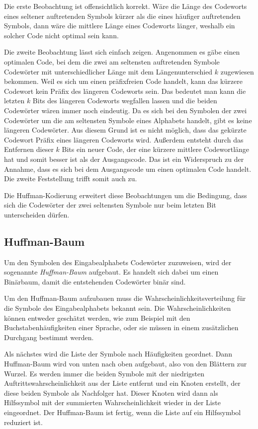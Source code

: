 \documentclass[twoside,11pt,a4paper]{article}
\theoremstyle{break}
\begin{document}
Die erste Beobachtung ist offensichtlich korrekt. Wäre die Länge des
Codeworts eines seltener auftretenden Symbols kürzer als die eines
häufiger auftretenden Symbols, dann wäre die mittlere Länge eines
Codeworts länger, weshalb ein solcher Code nicht optimal sein kann.

Die zweite Beobachtung lässt sich einfach zeigen. Angenommen es gäbe
einen optimalen Code, bei dem die zwei am seltensten auftretenden
Symbole Codewörter mit unterschiedlicher Länge mit dem
Längenunterschied $k$ zugewiesen bekommen. Weil es sich um einen
präfixfreien Code handelt, kann das kürzere Codewort kein Präfix des
längeren Codeworts sein. Das bedeutet man kann die letzten $k$ Bits
des längeren Codeworts wegfallen lassen und die beiden Codewörter
wären immer noch eindeutig. Da es sich bei den Symbolen der zwei
Codewörter um die am seltensten Symbole eines Alphabets handelt, gibt
es keine längeren Codewörter. Aus diesem Grund ist es nicht möglich,
dass das gekürzte Codewort Präfix eines längeren Codeworts
wird. Außerdem entsteht durch das Entfernen dieser $k$ Bits ein neuer
Code, der eine kürzere mittlere Codewortlänge hat und somit besser ist
als der Ausgangscode. Das ist ein Widerspruch zu der Annahme, dass es
sich bei dem Ausgangscode um einen optimalen Code handelt. Die zweite
Feststellung trifft somit auch zu.

Die Huffman-Kodierung erweitert diese Beobachtungen um die Bedingung,
dass sich die Codewörter der zwei seltensten Symbole nur beim letzten
Bit unterscheiden dürfen.

\subsection{Huffman-Baum} \label{sec:HTREE}
Um den Symbolen des Eingabealphabets Codewörter zuzuweisen, wird der
sogenannte \emph{Huffman-Baum} aufgebaut. Es handelt sich dabei um
einen Binärbaum, damit die entstehenden Codewörter binär sind.

Um den Huffman-Baum aufzubauen muss die Wahrscheinlichkeitsverteilung
für die Symbole des Eingabealphabets bekannt sein. Die
Wahrscheinlichkeiten können entweder geschätzt werden, wie zum
Beispiel mit den Buchstabenhäufigkeiten einer Sprache, oder sie müssen
in einem zusätzlichen Durchgang bestimmt werden.

Als nächstes wird die Liste der Symbole nach Häufigkeiten geordnet.
Dann Huffman-Baum wird von unten nach oben aufgebaut, also von den
Blättern zur Wurzel. Es werden immer die beiden Symbole mit der
niedrigsten Auftrittswahrscheinlichkeit aus der Liste entfernt und ein
Knoten erstellt, der diese beiden Symbole als Nachfolger hat. Dieser
Knoten wird dann als Hilfssymbol mit der summierten Wahrscheinlichkeit
wieder in der Liste eingeordnet. Der Huffman-Baum ist fertig, wenn die
Liste auf ein Hilfssymbol reduziert ist.
\end{document}
